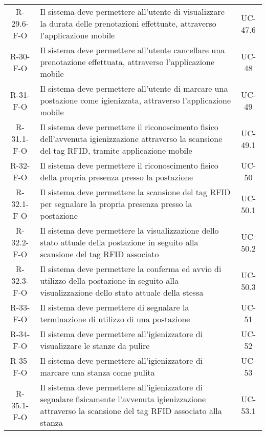 \begin{longtable}{ c C{9.5cm} c }
    R-29.6-F-O & Il sistema deve permettere all'utente di visualizzare la durata delle prenotazioni effettuate, attraverso l'applicazione mobile& UC-47.6\\
    R-30-F-O & Il sistema deve permettere all'utente cancellare una prenotazione effettuata, attraverso l'applicazione mobile& UC-48\\
    R-31-F-O & Il sistema deve permettere all'utente di marcare una postazione come igienizzata, attraverso l'applicazione mobile& UC-49\\
    R-31.1-F-O & Il sistema deve permettere il riconoscimento fisico dell'avvenuta igienizzazione attraverso la scansione del tag RFID, tramite applicazione mobile& UC-49.1\\
    R-32-F-O & Il sistema deve permettere il riconoscimento fisico della propria presenza presso la postazione& UC-50\\
    R-32.1-F-O & Il sistema deve permettere la scansione del tag RFID per segnalare la propria presenza presso la postazione& UC-50.1\\
    R-32.2-F-O & Il sistema deve permettere la visualizzazione dello stato attuale della postazione in seguito alla scansione del tag RFID associato& UC-50.2\\
    R-32.3-F-O & Il sistema deve permettere la conferma ed avvio di utilizzo della postazione in seguito alla visualizzazione dello stato attuale della stessa& UC-50.3\\
    R-33-F-O & Il sistema deve permettere di segnalare la terminazione di utilizzo di una postazione& UC-51\\
    R-34-F-O & Il sistema deve permettere all'igienizzatore di visualizzare le stanze da pulire& UC-52\\
    R-35-F-O & Il sistema deve permettere all'igienizzatore di marcare una stanza come pulita& UC-53\\
    R-35.1-F-O & Il sistema deve permettere all'igienizzatore di segnalare fisicamente l'avvenuta igienizzazione attraverso la scansione del tag RFID associato alla stanza& UC-53.1\\

\end{longtable}